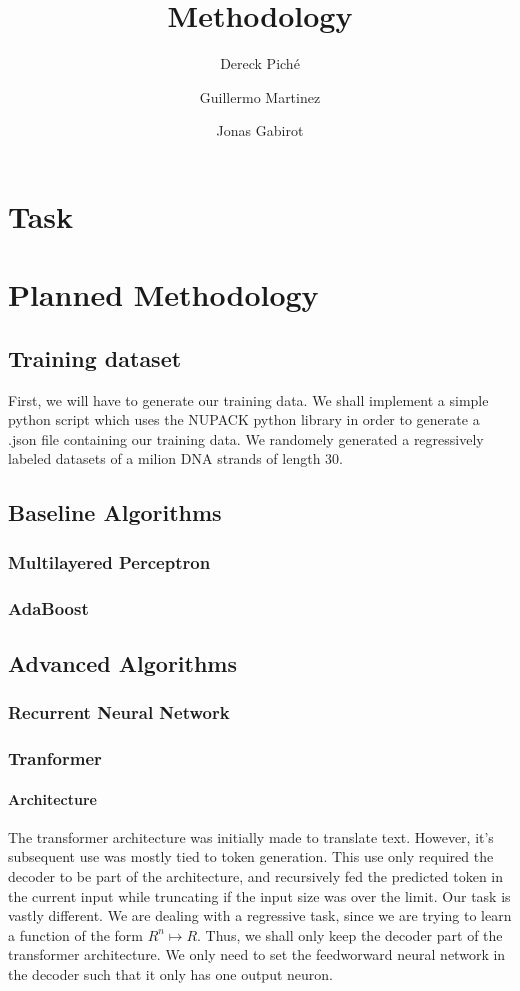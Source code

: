 \documentclass{article}
\title{Methodology}
\author
{
    Dereck Piché \and
    Guillermo Martinez \and
    Jonas Gabirot \and
}
\begin{document}
\maketitle

\section{Task}


\section{Planned Methodology}
\subsection{Training dataset}
First, we will have to generate our training data. We shall implement a 
simple python script which uses the NUPACK python library in order
to generate a .json file containing our training data. We randomely 
generated a regressively labeled datasets of a milion DNA strands of length $30$.
\subsection{Baseline Algorithms}
\cite{jeddi2017three}
\subsubsection{Multilayered Perceptron}

\subsubsection{AdaBoost}


\subsection{Advanced Algorithms}

\subsubsection{Recurrent Neural Network}

\subsubsection{Tranformer}
\paragraph{Architecture}
The transformer architecture was initially made to translate text.
However, it's subsequent use was mostly tied to token generation. 
This use only required the decoder to be part of the architecture, 
and recursively fed the predicted token in the current input while 
truncating if the input size was over the limit.
Our task is vastly different. We are dealing with a regressive task,
since we are trying to learn a function of the form $R^n \mapsto R$.
Thus, we shall only keep the decoder part of the transformer architecture. 
We only need to set the feedworward neural network in the decoder such that 
it only has one output neuron.
\end{document}
